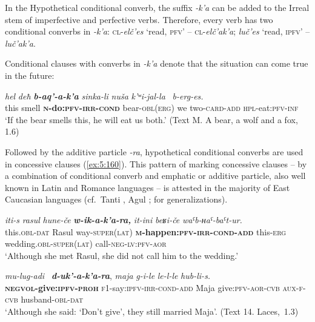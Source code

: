﻿\documentclass[output=paper]{langsci/langscibook}
\begin{document}
In the Hypothetical conditional converb, the suffix \emph{-k'a} can be added
to the Irreal stem of imperfective and perfective verbs. Therefore,
every verb has two conditional converbs in \emph{-k'a}:
\textsc{cl}-\emph{elč'es} `read, \textsc{pfv}' – \textsc{cl}-\emph{elč'ak'a}; \emph{luč'es} `read, \textsc{ipfv}' – \emph{luč'ak'a}.

Conditional clauses with converbs in \emph{-k'a} denote that the
situation can come true in the future:

\ea %
\gll \emph{hel} \emph{deħ} \emph{\textbf{b-aq'-a-k'a}} \emph{sinka-li} \emph{nuša} \emph{k'ʷi-jal-la~} \emph{b-erg-es.} \\
this smell \textbf{\textsc{n}-do:\textsc{pfv}-\textsc{irr}-\textsc{cond}} bear-\textsc{obl}(\textsc{erg}) we two-\textsc{card}-\textsc{add} \textsc{hpl}-eat:\textsc{pfv}-\textsc{inf} \\
\glt `If the bear smells this, he will eat us both.' (Text M. A bear, a wolf
and a fox, 1.6)
\z

Followed by the additive particle \emph{-ra}, hypothetical conditional
converbs are used in concessive clauses (\ref{ex:5:160}). This pattern of marking
concessive clauses – by a combination of conditional converb and
emphatic or additive particle, also well known in Latin and Romance
languages – is attested in the majority of East Caucasian languages
(cf.\ Tanti \citep[138]{sumbatova-lander2014}, Agul \citep{dobrushina-merdanova2012};
\citealt{forker2016} for generalizations).

\pagebreak

\ea \label{ex:5:160} %
\gll \emph{iti-s} \emph{rasul} \emph{hune-če} \emph{\textbf{w-ik-a-k'a-ra,}}  \emph{it-ini} \emph{beʁi-če} \emph{waˤb-ʜaˤ-baˤt-ur.}\\
 this.\textsc{obl}-\textsc{dat} Rasul way-\textsc{super}(\textsc{lat}) \textbf{\textsc{m}-happen:\textsc{pfv}-\textsc{irr}-\textsc{cond}-\textsc{add}} this-\textsc{erg} wedding.\textsc{obl}-\textsc{super}(\textsc{lat}) call-\textsc{neg}-\textsc{lv}:\textsc{pfv}-\textsc{aor}\\
\glt `Although she met Rasul, she did not call him to the wedding.'

\ex %
\gll \emph{mu-lug-adi~} \emph{\textbf{d-uk'-a-k'a-ra}}, \emph{maja} \emph{g-i-le} \emph{le-l-le} \emph{hub-li-s.}\\
\textbf{\textsc{negvol}-give:\textsc{ipfv}-\textsc{proh}} \textsc{f1}-say:\textsc{ipfv}-\textsc{irr}-\textsc{cond}-\textsc{add} Maja give:\textsc{pfv}-\textsc{aor}-\textsc{cvb} \textsc{aux}-\textsc{f}-\textsc{cvb} husband-\textsc{obl}-\textsc{dat} \\
\glt `Although she said: `Don't give', they still married Maja'. (Text 14.
Laces,~1.3)
\z
\end{document}

